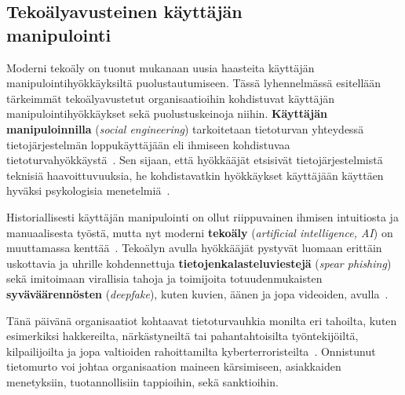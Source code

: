 

\begin{otherlanguage}{finnish}
\chapter*{Tekoälyavusteinen käyttäjän\\manipulointi\label{chapter:finnish}}

Moderni tekoäly on tuonut mukanaan uusia haasteita käyttäjän manipulointihyökkäyksiltä puolustautumiseen. Tässä lyhennelmässä esitellään tärkeimmät tekoälyavustetut organisaatioihin kohdistuvat käyttäjän manipulointihyökkäykset sekä puolustuskeinoja niihin. \textbf{Käyttäjän manipuloinnilla} (\textit{social engineering}) tarkoitetaan tietoturvan yhteydessä tietojärjestelmän loppukäyttäjään eli ihmiseen kohdistuvaa tietoturvahyökkäystä~\citep{hatfield_SE_Evolution_Concept_2018}. Sen sijaan, että hyökkääjät etsisivät tietojärjestelmistä teknisiä haavoittuvuuksia, he kohdistavatkin hyökkäykset käyttäjään käyttäen hyväksi psykologisia menetelmiä~\citep{wang_Defining_Social_Engineering_2020}.

Historiallisesti käyttäjän manipulointi on ollut riippuvainen ihmisen intuitiosta ja manuaalisesta työstä, mutta nyt moderni \textbf{tekoäly} (\textit{artificial intelligence, AI}) on muuttamassa kenttää~\citep{blauth_AI_Crime_Overview_Malicious_Use_Abuse_2022, king_AI_Crime_Interdisciplinary_Analysis_2019, mirsky_Threat_Offensive_AI_Organizations_2023}. Tekoälyn avulla hyökkääjät pystyvät luomaan erittäin uskottavia ja uhrille kohdennettuja \textbf{tietojenkalasteluviestejä} (\textit{spear phishing}) sekä imitoimaan virallisia tahoja ja toimijoita totuudenmukaisten \textbf{syväväärennösten} (\textit{deepfake}), kuten kuvien, äänen ja jopa videoiden, avulla~\citep{mirsky_Creation_Detection_Deepfakes_2021}.

Tänä päivänä organisaatiot kohtaavat tietoturvauhkia monilta eri tahoilta, kuten esimerkiksi hakkereilta, närkästyneiltä tai pahantahtoisilta työntekijöiltä, kilpailijoilta ja jopa valtioiden rahoittamilta kyberterroristeilta~\citep{mirsky_Threat_Offensive_AI_Organizations_2023}. Onnistunut tietomurto voi johtaa organisaation maineen kärsimiseen, asiakkaiden menetyksiin, tuotannollisiin tappioihin, sekä sanktioihin.


\end{otherlanguage}
